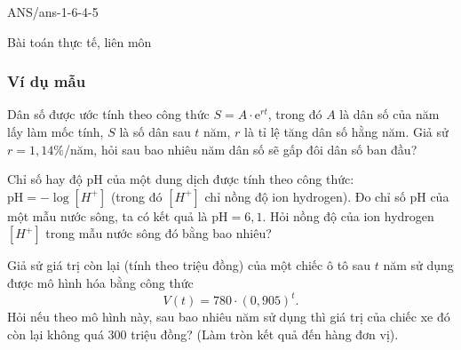 \begin{indapan}{10}
	{ANS/ans-1-6-4-5}
\end{indapan}
\begin{dang}{Bài toán thực tế, liên môn}
	
\end{dang}
\subsubsection{Ví dụ mẫu}

\begin{vd} 
	Dân số được ước tính theo công thức $S=A\cdot \mathrm{e}^{rt}$, trong đó $A$ là dân số của năm lấy làm mốc tính, $S$ là số dân sau $t$ năm, $r$ là tỉ lệ tăng dân số hằng năm. Giả sử $r=1{,}14\%$/năm, hỏi sau bao nhiêu năm dân số sẽ gấp đôi dân số ban đầu?
\end{vd}

\begin{vd} 
	Chỉ số hay độ pH của một dung dịch được tính theo công thức: $\text{pH} = -\log [H^+]$ (trong đó $[H^+]$ chỉ nồng độ ion hydrogen). Đo chỉ số pH của một mẫu nước sông, ta có kết quả là $\text{pH} =6{,}1$. Hỏi nồng độ của ion hydrogen $[H^+]$ trong mẫu nước sông đó bằng bao nhiêu?
\end{vd}

\begin{vd} 
	Giả sử giá trị còn lại (tính theo triệu đồng) của một chiếc ô tô sau $t$ năm sử dụng được mô hình hóa bằng công thức
	$$V(t)=780\cdot (0{,}905)^t.$$
	Hỏi nếu theo mô hình này, sau bao nhiêu năm sử dụng thì giá trị của chiếc xe đó còn lại không quá $300$ triệu đồng? (Làm tròn kết quả đến hàng đơn vị).
\end{vd}

